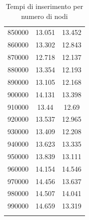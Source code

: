 \documentclass{article}
\begin{document}
\begin{longtable}{c|c|c}
           850000 &                     13.051 &                     13.452 \\
           860000 &                     13.302 &                     12.843 \\
           870000 &                     12.718 &                     12.137 \\
           880000 &                     13.354 &                     12.193 \\
           890000 &                     13.105 &                     12.168 \\
           900000 &                     14.131 &                     13.398 \\
           910000 &                     13.44  &                     12.69  \\
           920000 &                     13.537 &                     12.965 \\
           930000 &                     13.409 &                     12.208 \\
           940000 &                     13.623 &                     13.335 \\
           950000 &                     13.839 &                     13.111 \\
           960000 &                     14.154 &                     14.546 \\
           970000 &                     14.456 &                     13.637 \\
           980000 &                     14.507 &                     14.041 \\
           990000 &                     14.659 &                     13.319 \\
\hline
\caption{Tempi di inserimento per numero di nodi}
\end{longtable}

\newpage
\end{document}
